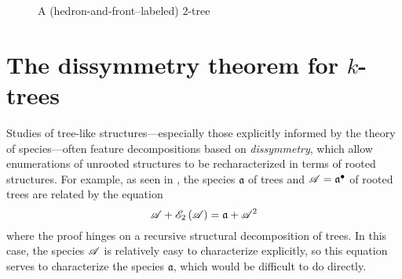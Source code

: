 \documentclass[sectionflow,singlespace,twoside,boldmathhdr,draft]{brandiss} %
\numberwithin{section}{chapter}
\numberwithin{figure}{chapter}
\begin{document}
\begin{figure}[htb]
  \centering
  \caption{A (hedron-and-front--labeled) $2$-tree}
  \label{fig:exlab2tree}
\end{figure}

\section{The dissymmetry theorem for $k$-trees}\label{s:dissymk}
Studies of tree-like structures---especially those explicitly informed by the theory of species---often feature decompositions based on \emph{dissymmetry}, which allow enumerations of unrooted structures to be recharacterized in terms of rooted structures.
For example, as seen in \cite[\S 4.1]{bll:species}, the species $\mathfrak{a}$ of trees and $\mathscr{A} =  {\mathfrak{a}}^{\bullet } $ of rooted trees are related by the equation
\begin{equation*}
  \mathscr{A} + \mathscr{E}_{2} \left( {\mathscr{A}} \right) = \mathfrak{a} + \mathscr{A}^{2}
\end{equation*}
where the proof hinges on a recursive structural decomposition of trees.
In this case, the species $\mathscr{A}$ is relatively easy to characterize explicitly, so this equation serves to characterize the species $\mathfrak{a}$, which would be difficult to do directly.
\end{document}
